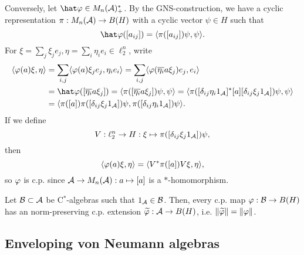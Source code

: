 \documentclass{../../small}
\begin{document}
\begin{pf}
Conversely, let $\hat\f\in M_n(\cA)^*_+$.
By the GNS-construction, we have a cyclic representation $\pi:M_n(\mathcal{A})\to B(H)$ with a cyclic vector $\psi\in H$ such that
\[\hat\f([a_{ij}])=\<\pi([a_{ij}])\psi,\psi\>.\]
For $\xi=\sum_j\xi_je_j,\eta=\sum_i\eta_ie_i\in\ell_2^n$, write
\begin{align*}
\<\f(a)\xi,\eta\>
&=\sum_{i,j}\<\f(a)\xi_je_j,\eta_ie_i\>
=\sum_{i,j}\<\f(\bar{\eta_i}a\xi_j)e_j,e_i\>\\
&=\hat\f([\bar{\eta_i}a\xi_j])
=\<\pi([\bar{\eta_i}a\xi_j])\psi,\psi\>
=\<\pi([\delta_{ij}\eta_i1_\cA]^*[a][\delta_{ij}\xi_j1_\cA])\psi,\psi\>\\
&=\<\pi([a])\pi([\delta_{ij}\xi_j1_\cA])\psi,\pi([\delta_{ij}\eta_i1_\cA])\psi\>.
\end{align*}
If we define
\[V:\ell_2^n\to H:\xi\mapsto\pi([\delta_{ij}\xi_j1_{\mathcal{A}}])\psi,\]
then
\[\langle\varphi(a)\xi,\eta\rangle=\langle V^*\pi([a])V\xi,\eta\rangle,\]
so $\varphi$ is c.p. since $\mathcal{A}\to M_n(\mathcal{A}):a\mapsto[a]$ is a $*$-homomorphism.
\end{pf}

\begin{thm}
Let $\mathcal{B}\subset\mathcal{A}$ be C$^*$-algebras such that $1_{\mathcal{A}}\in\mathcal{B}$.
Then, every c.p. map $\varphi:\mathcal{B}\to B(H)$ has an norm-preserving c.p. extension $\widetilde{\varphi}:\mathcal{A}\to B(H)$, i.e. $\|\widetilde{\varphi}\|=\|\varphi\|$.
\end{thm}



\subsection{Enveloping von Neumann algebras}
\end{document}
